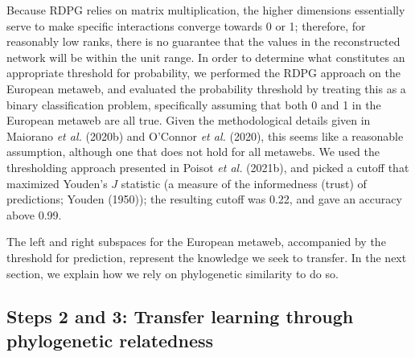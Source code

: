 \documentclass[11pt]{article}
\begin{document}
Because RDPG relies on matrix multiplication, the higher dimensions
essentially serve to make specific interactions converge towards 0 or 1;
therefore, for reasonably low ranks, there is no guarantee that the
values in the reconstructed network will be within the unit range. In
order to determine what constitutes an appropriate threshold for
probability, we performed the RDPG approach on the European metaweb, and
evaluated the probability threshold by treating this as a binary
classification problem, specifically assuming that both 0 and 1 in the
European metaweb are all true. Given the methodological details given in
Maiorano \emph{et al.} (2020b) and O'Connor \emph{et al.} (2020), this
seems like a reasonable assumption, although one that does not hold for
all metawebs. We used the thresholding approach presented in Poisot
\emph{et al.} (2021b), and picked a cutoff that maximized Youden's \(J\)
statistic (a measure of the informedness (trust) of predictions; Youden
(1950)); the resulting cutoff was 0.22, and gave an accuracy above 0.99.

The left and right subspaces for the European metaweb, accompanied by
the threshold for prediction, represent the knowledge we seek to
transfer. In the next section, we explain how we rely on phylogenetic
similarity to do so.

\hypertarget{steps-2-and-3-transfer-learning-through-phylogenetic-relatedness}{%
\subsection{Steps 2 and 3: Transfer learning through phylogenetic
relatedness}\label{steps-2-and-3-transfer-learning-through-phylogenetic-relatedness}}
\end{document}
